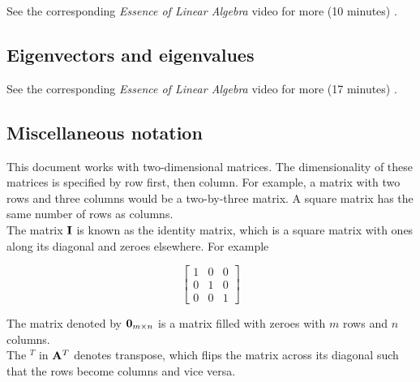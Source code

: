 See the corresponding \textit{Essence of Linear Algebra} video for more (10
minutes) \cite{bib:linalg_the_determinant}.

\subsection{Eigenvectors and eigenvalues}

See the corresponding \textit{Essence of Linear Algebra} video for more (17
minutes) \cite{bib:linalg_eigenvectors_and_eigenvalues}.

\subsection{Miscellaneous notation}

This document works with two-dimensional matrices. The dimensionality of these
matrices is specified by row first, then column. For example, a matrix with two
rows and three columns would be a two-by-three matrix. A square matrix has the
same number of rows as columns. \\

The matrix $\mathbf{I}$ is known as the identity matrix, which is a square matrix
with ones along its diagonal and zeroes elsewhere. For example

\begin{equation*}
  \left[
  \begin{array}{ccc}
    1 & 0 & 0 \\
    0 & 1 & 0 \\
    0 & 0 & 1
  \end{array}
  \right]
\end{equation*}

The matrix denoted by $\mathbf{0}_{m \times n}$ is a matrix filled with zeroes with
$m$ rows and $n$ columns. \\

The $^T$ in $\mathbf{A}^T$ denotes transpose, which flips the matrix across its
diagonal such that the rows become columns and vice versa.
